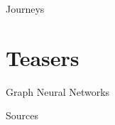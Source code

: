 \documentclass{beamer}
\begin{document}
\begin{frame}{Journeys}

\end{frame}


\section{Teasers}

\begin{frame}{Graph Neural Networks}

\end{frame}

\begin{frame}{Sources}
  
  
\end{frame}
\end{document}
